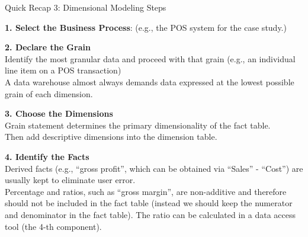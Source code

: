 \begin{frame}[fragile]{Quick Recap 3: Dimensional Modeling Steps}
	\begin{small}
		\textbf{1. Select the Business Process}: (e.g., the POS system for the case study.)\\\vspace{5pt}
		
		\textbf{2. Declare the Grain}\\
		Identify the most granular data and proceed with that grain (e.g., an individual line item on a POS transaction)\\
		A data warehouse almost always demands data expressed at the lowest possible grain of each dimension.
		\\\vspace{5pt}
		
		\textbf{3. Choose the Dimensions}\\
		Grain statement determines the primary dimensionality of the fact table.\\
		Then add descriptive dimensions into the dimension table.\\\vspace{5pt}
		
		\textbf{4. Identify the Facts}\\
		Derived facts (e.g., ``gross profit'', which can be obtained via ``Sales'' - ``Cost'') are usually kept to eliminate user error.\\
		Percentage and ratios, such as ``gross margin'', are non-additive and therefore should not be included in the fact table (instead we should keep the numerator and denominator in the fact table). The ratio can be calculated in a data access tool (the 4-th component). 
		
	\end{small}
\end{frame}

